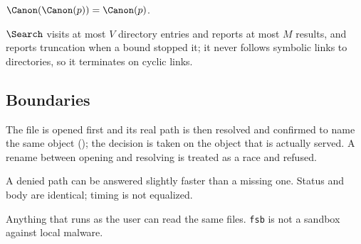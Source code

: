 \begin{law}
\label{law:canon}
$\Canon(\Canon(p))=\Canon(p)$.
\end{law}

\begin{law}
\label{law:bounded}
$\Search$ visits at most $V$ directory entries and reports at most $M$ results,
and reports truncation when a bound stopped it; it never follows symbolic links
to directories, so it terminates on cyclic links.
\end{law}

\subsection{Boundaries}

\begin{boundary}
The file is opened first and its real path is then resolved and confirmed to
name the same object (); the decision is taken on the object that
is actually served.  A rename between opening and resolving is treated as a
race and refused.
\end{boundary}

\begin{boundary}
A denied path can be answered slightly faster than a missing one.  Status and
body are identical; timing is not equalized.
\end{boundary}

\begin{boundary}
Anything that runs as the user can read the same files.  \texttt{fsb} is not a
sandbox against local malware.
\end{boundary}
